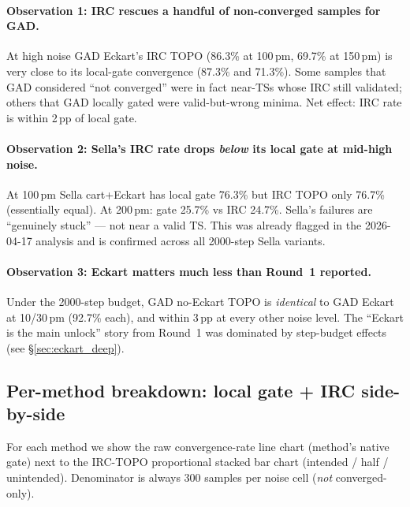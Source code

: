 \documentclass[11pt]{article}
\begin{document}
\paragraph{Observation 1: IRC rescues a handful of non-converged samples
for GAD.} At high noise GAD Eckart's IRC TOPO (86.3\% at 100\,pm, 69.7\%
at 150\,pm) is very close to its local-gate convergence (87.3\% and
71.3\%). Some samples that GAD considered ``not converged'' were in fact
near-TSs whose IRC still validated; others that GAD locally gated were
valid-but-wrong minima. Net effect: IRC rate is within 2\,pp of local
gate.

\paragraph{Observation 2: Sella's IRC rate drops \emph{below} its local
gate at mid-high noise.} At 100\,pm Sella cart+Eckart has local gate
76.3\% but IRC TOPO only 76.7\% (essentially equal). At 200\,pm: gate
25.7\% vs IRC 24.7\%. Sella's failures are ``genuinely stuck'' —
not near a valid TS. This was already flagged in the 2026-04-17 analysis
and is confirmed across all 2000-step Sella variants.

\paragraph{Observation 3: Eckart matters much less than Round~1 reported.}
Under the 2000-step budget, GAD no-Eckart TOPO is \emph{identical} to GAD
Eckart at 10/30\,pm (92.7\% each), and within 3\,pp at every other noise
level. The ``Eckart is the main unlock'' story from Round~1 was dominated
by step-budget effects (see §\ref{sec:eckart_deep}).

\newpage
\clearpage
\subsection{Per-method breakdown: local gate + IRC side-by-side}

For each method we show the raw convergence-rate line chart (method's
native gate) next to the IRC-TOPO proportional stacked bar chart
(intended / half / unintended). Denominator is always 300 samples per
noise cell (\emph{not} converged-only).
\end{document}
